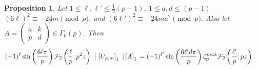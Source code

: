 \documentclass[12pt]{amsart}
\newtheorem{prop}[theorem]{Proposition}
\theoremstyle{definition}
\theoremstyle{remark}
\numberwithin{equation}{section}
\newcommand{\Parans}[1]{\left(#1\right)}
\newcommand\Fell[4]{\mathcal{F}_{#1}\left(\frac{#2}{#3};#4\right)}
\newcommand\strokeb[2]{\,\left\arrowvert\,\left[#1\right]_#2\right.}
\begin{document}
\begin{prop}\label{propo:F2transUA}
Let  $1 \le \ell,\ell' \le \tfrac{1}{2}(p-1)$, $1 \le a,d \le (p-1)$
$(6\ell)^2 \equiv -24m \pmod{p}$, and $(6\ell')^2 \equiv -24ma^2 \pmod{p}$. 
Also let
$A = \begin{pmatrix}
      a & k \\ p & d 
    \end{pmatrix}
\in \Gamma_0(p).$ 
Then
\begin{align*}
&(-1)^{\ell} \sin\Parans{\frac{6\ell\pi}{p}}
\Fell{2}{\ell}{p}{p^2z} \strokeb{U_{p,m}}{1} \strokeb{A}{1}= 
(-1)^{\ell'} \sin\Parans{\frac{6\ell'd\pi}{p}}
\zeta_p^{mak} 
\Fell{2}{\ell'}{p}{pz} .
\end{align*}

\end{prop}
\end{document}
